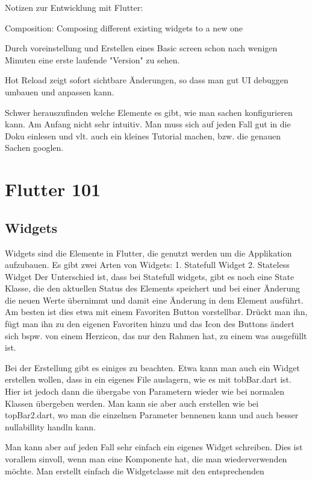 Notizen zur Entwicklung mit Flutter:

Composition: Composing different existing widgets to a new one

Durch voreinstellung und Erstellen eines Basic screen schon nach wenigen Minuten eine erste laufende "Version" zu sehen.

Hot Reload zeigt sofort sichtbare Änderungen, so dass man gut UI debuggen umbauen und anpassen kann.

Schwer herauszufinden welche Elemente es gibt, wie man sachen konfigurieren kann. Am Anfang nicht sehr intuitiv. Man muss sich auf jeden Fall gut in die Doku einlesen und vlt. auch ein kleines Tutorial machen, bzw. die genauen Sachen googlen.



\section{Flutter 101}
\subsection{Widgets}
Widgets sind die Elemente in Flutter, die genutzt werden um die Applikation aufzubauen.
Es gibt zwei Arten von Widgets:
1. Statefull Widget
2. Stateless Widget
Der Unterschied ist, dass bei Statefull widgets, gibt es noch eine State Klasse, die den aktuellen Status des Elements speichert und bei einer Änderung die neuen Werte übernimmt und damit eine Änderung in dem Element ausführt. Am besten ist dies etwa mit einem Favoriten Button vorstellbar. Drückt man ihn, fügt man ihn zu den eigenen Favoriten hinzu und das Icon des Buttons ändert sich bspw. von einem Herzicon, das nur den Rahmen hat, zu einem was ausgefüllt ist.

Bei der Erstellung gibt es einiges zu beachten. 
Etwa kann man auch ein Widget erstellen wollen, dass in ein eigenes File auslagern, wie es mit tobBar.dart ist. Hier ist jedoch dann die übergabe von Parametern wieder wie bei normalen Klassen übergeben werden. Man kann sie aber auch erstellen wie bei topBar2.dart, wo man die einzelnen Parameter bennenen kann und auch besser nullabillity handln kann.

Man kann aber auf jeden Fall sehr einfach ein eigenes Widget schreiben. Dies ist vorallem sinvoll, wenn man eine Komponente hat, die man wiederverwenden möchte. Man erstellt einfach die Widgetclasse mit den entsprechenden 
